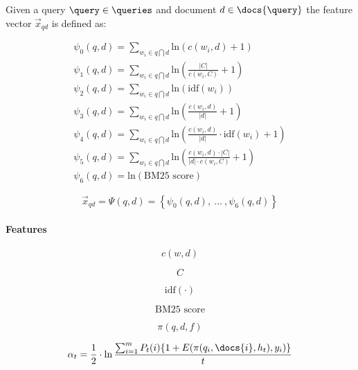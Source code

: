 \begin{definition}
  Given a query $\query \in \queries$ and document $d \in \docs{\query}$ the feature
  vector ${\vec{x}}_{q d}$ is defined as:

  \[
  \begin{array}{l}
    \psi_0(q, d) = \sum_{w_i \in q \bigcap d} \text{ln}(c(w_i, d) + 1) \\
    \psi_1(q, d) = \sum_{w_i \in q \bigcap d} \text{ln}(\frac{|C|}{c(w_i, C)} + 1) \\
    \psi_2(q, d) = \sum_{w_i \in q \bigcap d} \text{ln}(\text{idf}(w_i)) \\
    \psi_3(q, d) = \sum_{w_i \in q \bigcap d} \text{ln}(\frac{c(w_i, d)}{|d|} + 1) \\
    \psi_4(q, d) = \sum_{w_i \in q \bigcap d} \text{ln}(\frac{c(w_i, d)}{|d|} \cdot \text{idf}(w_i) + 1) \\
    \psi_5(q, d) = \sum_{w_i \in q \bigcap d} \text{ln}(\frac{c(w_i, d) \cdot |C|}{|d| \cdot c(w_i, C)} + 1) \\
    \psi_6(q, d) = \text{ln}( \text{BM25 score} )
  \end{array}
  \]

  \[
    {\vec{x}}_{q d} = \Psi(q, d) = \left\{ \psi_0(q, d), ~\ldots~, \psi_6(q, d) \right\}
  \]
\end{definition}

\paragraph{Features}

\begin{definition}
  \[ c(w, d) \]
\end{definition}

\begin{definition}
  \[ C \]
\end{definition}

\begin{definition}
  \[ \text{idf}(\cdot) \]
\end{definition}

\begin{definition}
  \[ \text{BM25 score} \]
\end{definition}

\begin{definition}
  \[ \pi(q, d, f) \]
\end{definition}

\[
  \alpha_t = \frac{1}{2} \cdot \ln \frac{
    \sum^m_{i=1} P_t(i) \{ 1 + E(\pi(q_i, \docs{i}, h_t), y_i) \}
  }{
    t
  }
\]
